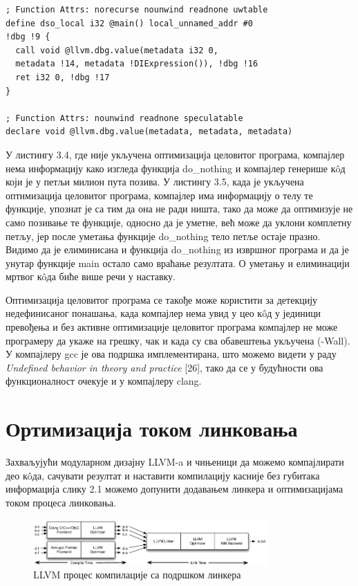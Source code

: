 \documentclass[12pt,oneside]{memoir}
\begin{document}
\begin{lstlisting}[frame=single, caption={Međureprezentacija sa optimizacijom celovitog programa}, captionpos=b]
; Function Attrs: norecurse nounwind readnone uwtable
define dso_local i32 @main() local_unnamed_addr #0 
!dbg !9 {
  call void @llvm.dbg.value(metadata i32 0, 
  metadata !14, metadata !DIExpression()), !dbg !16
  ret i32 0, !dbg !17
}

; Function Attrs: nounwind readnone speculatable
declare void @llvm.dbg.value(metadata, metadata, metadata)

\end{lstlisting}

У листингу 3.4, где није укључена оптимизација целовитог програма, компајлер нема информацију  како
изгледа функција do{\_}nothing и компајлер генерише к\^{o}д који је у петљи милион пута позива.
У листингу 3.5, када је укључена оптимизација целовитог програма, компајлер има информацију о телу те функције,
упознат је са тим да она не ради ништа, тако да може да оптимизује не само позивање те функције,
односно да је уметне, већ може да уклони комплетну петљу, јер после уметања
функције do{\_}nothing тело петље остаје празно.
Видимо да је елиминисана и функција do{\_}nothing из извршног програма и да је унутар
функције main остало само враћање резултата.
О уметању и елиминацији мртвог к\^{o}да биће више речи у наставку.

Оптимизација целовитог програма се такође може користити за детекцију недефинисаног
понашања, када компајлер нема увид у цео к\^{o}д у јединици превођења и без
активне оптимизације целовитог програма компајлер не може програмеру да укаже
на грешку, чак и када су сва обавештења укључена (-Wall).
У компајлеру gcc је ова подршка имплементирана, што можемо видети у раду
\textit{Undefined behavior in theory and practice} [26], тако да се у будућности ова
функционалност очекује и у компајлеру clang.

\section{Ортимизација током линковања}


Захваљујући модуларном дизајну LLVM-a и чињеници да можемо компајлирати део к\^{o}да,
сачувати резултат и наставити компилацију касније без губитака информација
слику 2.1 можемо допунити додавањем линкера и оптимизацијама током процеса линковања.

\begin{figure}[!ht]
  \centering
  \includegraphics[width=0.8\textwidth]{LTO.png}
  \caption{LLVM процес компилације са подршком линкера}
  \label{fig:grafikon}
\end{figure}
\end{document}
